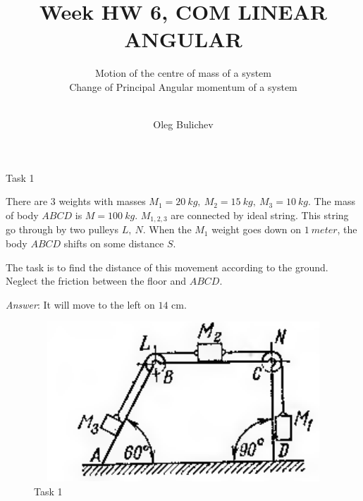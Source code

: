 \documentclass[aspectratio=169]{beamer}
\title[Theoretical Mechanics]{Week HW 6, COM LINEAR ANGULAR} %
\subtitle{Motion of the centre of mass of a system\\
Change of Principal Angular momentum of a system\\
\ 
         } %
\author{Oleg Bulichev}
\newcommand{\fbckg}[1]{\usebackgroundtemplate{\texttt{[image: \#1]}}}%
\begin{document}
\setlength{\abovedisplayskip}{0pt}
\setlength{\belowdisplayskip}{0pt}
\setlength{\abovedisplayshortskip}{0pt}
\setlength{\belowdisplayshortskip}{0pt}

\fbckg{fibeamer/figs/title_page.png}

\fbckg{fibeamer/figs/common.png}


\begin{frame}[t]{Task 1}
  \begin{minipage}{0.6\textwidth}
    There are 3 weights with masses $M_1=20\ kg,\ M_2=15\ kg,\ M_3=10\ kg$. The mass of body $ABCD$ is $M=100\ kg$. $M_{1,2,3}$ are connected by ideal string. This string go through by two pulleys $L,\ N$. When the $M_1$ weight goes down on $1\ meter$, the body $ABCD$ shifts on some distance $S$.

    The task is to find the distance of this movement according to the ground. Neglect the friction between the floor and $ABCD$. \smallskip
    
    \textit{Answer}: It will move to the left on $14$ cm.
  \end{minipage}
  \begin{minipage}{0.39\textwidth}
    \begin{figure}[H]
      \centering\includegraphics[height=6cm,width=1\textwidth,keepaspectratio]{HW5_3}
      \caption*{Task 1}
    \end{figure}
  \end{minipage}
\end{frame}
\end{document}
